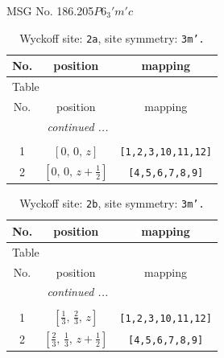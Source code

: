 \documentclass[fleqn,8pt]{jsarticle}
\begin{document}
\setcounter{MaxMatrixCols}{32}

\renewcommand{\tablename}{Table~}
\renewcommand{\figurename}{Figure~}
\begin{center}
\LARGE
MSG No. 186.205\quad$P6_{3}'m'c$
\end{center}
\renewcommand{\arraystretch}{1.2}
\begin{longtable}{ccc}
\caption{Wyckoff site: {\tt 2a}, site symmetry: {\tt 3m'.}}
 \\
 \hline \hline
No. & position & mapping \\ \hline \endfirsthead

\multicolumn{2}{l}{\tablename\ \thetable{}} \\
 \hline \hline
No. & position & mapping \\ \hline \endhead

 \hline \hline
\multicolumn{2}{r}{\footnotesize\it continued ...} \\ \endfoot

 \hline \hline
\multicolumn{2}{r}{} \\ \endlastfoot

1 & $\left[ 0,\, 0,\, z \right]$ & {\tt [1,2,3,10,11,12]} \\ \hline
2 & $\left[ 0,\, 0,\, z + \frac{1}{2} \right]$ & {\tt [4,5,6,7,8,9]} \\
\end{longtable}
\renewcommand{\arraystretch}{1.2}
\begin{longtable}{ccc}
\caption{Wyckoff site: {\tt 2b}, site symmetry: {\tt 3m'.}}
 \\
 \hline \hline
No. & position & mapping \\ \hline \endfirsthead

\multicolumn{2}{l}{\tablename\ \thetable{}} \\
 \hline \hline
No. & position & mapping \\ \hline \endhead

 \hline \hline
\multicolumn{2}{r}{\footnotesize\it continued ...} \\ \endfoot

 \hline \hline
\multicolumn{2}{r}{} \\ \endlastfoot

1 & $\left[ \frac{1}{3},\, \frac{2}{3},\, z \right]$ & {\tt [1,2,3,10,11,12]} \\ \hline
2 & $\left[ \frac{2}{3},\, \frac{1}{3},\, z + \frac{1}{2} \right]$ & {\tt [4,5,6,7,8,9]} \\
\end{longtable}
\end{document}
